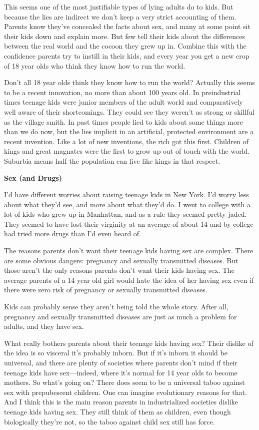 This seems one of the most justifiable types of lying adults do to kids.
But because the lies are indirect we don't keep a very strict accounting
of them. Parents know they've concealed the facts about sex, and many at
some point sit their kids down and explain more. But few tell their kids
about the differences between the real world and the cocoon they grew up
in. Combine this with the confidence parents try to instill in their
kids, and every year you get a new crop of 18 year olds who think they
know how to run the world.

Don't all 18 year olds think they know how to run the world? Actually
this seems to be a recent innovation, no more than about 100 years old.
In preindustrial times teenage kids were junior members of the adult
world and comparatively well aware of their shortcomings. They could see
they weren't as strong or skillful as the village smith. In past times
people lied to kids about some things more than we do now, but the lies
implicit in an artificial, protected environment are a recent invention.
Like a lot of new inventions, the rich got this first. Children of kings
and great magnates were the first to grow up out of touch with the
world. Suburbia means half the population can live like kings in that
respect.

\textbf{Sex (and Drugs)}

I'd have different worries about raising teenage kids in New York. I'd
worry less about what they'd see, and more about what they'd do. I went
to college with a lot of kids who grew up in Manhattan, and as a rule
they seemed pretty jaded. They seemed to have lost their virginity at an
average of about 14 and by college had tried more drugs than I'd even
heard of.

The reasons parents don't want their teenage kids having sex are
complex. There are some obvious dangers: pregnancy and sexually
transmitted diseases. But those aren't the only reasons parents don't
want their kids having sex. The average parents of a 14 year old girl
would hate the idea of her having sex even if there were zero risk of
pregnancy or sexually transmitted diseases.

Kids can probably sense they aren't being told the whole story. After
all, pregnancy and sexually transmitted diseases are just as much a
problem for adults, and they have sex.

What really bothers parents about their teenage kids having sex? Their
dislike of the idea is so visceral it's probably inborn. But if it's
inborn it should be universal, and there are plenty of societies where
parents don't mind if their teenage kids have sex---indeed, where it's
normal for 14 year olds to become mothers. So what's going on? There
does seem to be a universal taboo against sex with prepubescent
children. One can imagine evolutionary reasons for that. And I think
this is the main reason parents in industrialized societies dislike
teenage kids having sex. They still think of them as children, even
though biologically they're not, so the taboo against child sex still
has force.

